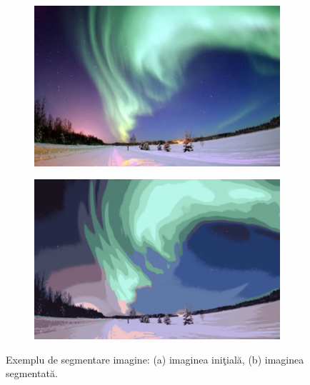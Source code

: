\begin{figure}
     \centering
     \begin{subfigure}[b]{0.45\textwidth}
         \centering
         \includegraphics[width=\textwidth]{Instructions/Figs/Regular/Picture1.jpg}
         \caption{}
         \label{fig:a}
     \end{subfigure}
     \hfill
     \begin{subfigure}[b]{0.45\textwidth}
         \centering
         \includegraphics[width=\textwidth]{Instructions/Figs/Regular/Picture2.png}
         \caption{}
         \label{fig:b}
     \end{subfigure}
     \hfill
    \caption{Exemplu de segmentare imagine: (a) imaginea ini\c{t}ial\u{a}, (b) imaginea segmentat\u{a}.}
    \label{fig:exemplu_figura}
\end{figure}
  
